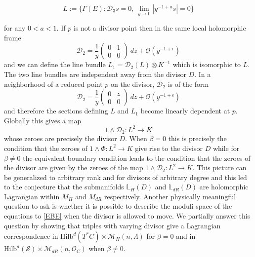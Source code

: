\documentclass[twoside, 11pt]{article}
\numberwithin{equation}{section}
\theoremstyle{theorem}
\numberwithin{theorem}{section}
\theoremstyle{definition}
\newcommand{\D}{\mathcal D}
\begin{document}
\begin{equation}
L:= \{\Gamma(E) : \D_3s= 0, ~\lim\limits_{y\to 0} |y^{-1+a}s| = 0\}
\end{equation}

for any $0 <a<1$. If $p$ is not a divisor point then in the same local holomorphic frame 
%
\begin{equation}
\D_2 = \frac{1}{y}\begin{pmatrix} 0&1\\0&0\end{pmatrix}\,dz + \mathcal O(y^{-1+\epsilon})
\end{equation}
%
and we can define the line bundle $L_1 = \D_2(L)\otimes K^{-1}$ which is isomorphic to $L$. The two line bundles are independent away from the divisor $D$. In a neighborhood of a reduced point $p$ on the divisor, $\D_2$ is of the form 
%
\begin{equation}
\D_2 = \frac{1}{y}\begin{pmatrix} 0&z\\0&0\end{pmatrix}\,dz + \mathcal O(y^{-1+\epsilon})
\end{equation}
%
and therefore the sections defining $L$ and $L_1$ become linearly dependent at $p$. Globally this gives a map 
%
\begin{equation}
1\wedge \D_2: L^2\to K 
\end{equation}
%
whose zeroes are precisely the divisor $D$. When $\beta = 0$ this is precisely the condition that the zeroes of $1\wedge \Phi :L^2\to K$ give rise to the divisor $D$ while for $\beta\neq 0$ the equivalent boundary condition leads to the condition that the zeroes of the divisor are given by the zeroes of the map $1\wedge \D_2:L^2\to K$. This picture can be generalized to arbitrary rank and for divisors of arbitrary degree and this led to the conjecture that the submanifolds $\mathbb L_H(D)$ and $\mathbb L_{dR}(D)$ are holomorphic Lagrangian within $M_H$ and $M_{dR}$ respectively. Another physically meaningful question to ask is whether it is possible to describe the moduli space of the equations to \eqref{EBE} when the divisor is allowed to move. We partially answer this question by showing that triples with varying divisor give a Lagrangian correspondence in $\mathrm{Hilb}^d(T^\ast C) \times \mathcal{M}_H(n, \Lambda)$ for $\beta=0$ and in $\mathrm{Hilb}^d(\mathcal{S}) \times \mathcal{M}_{dR}(n, \mathcal{O}_C)$ when $\beta\neq 0$. 
\end{document}
